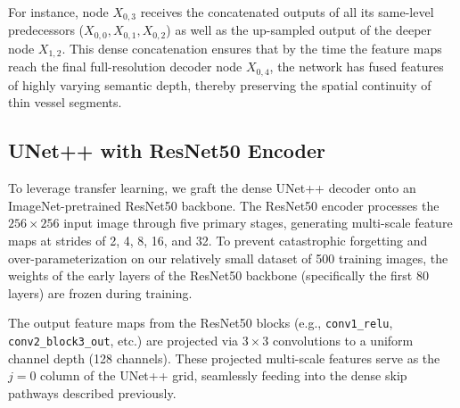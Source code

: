 For instance, node $X_{0,3}$ receives the concatenated outputs of all its same-level predecessors ($X_{0,0}, X_{0,1}, X_{0,2}$) as well as the up-sampled output of the deeper node $X_{1,2}$. This dense concatenation ensures that by the time the feature maps reach the final full-resolution decoder node $X_{0,4}$, the network has fused features of highly varying semantic depth, thereby preserving the spatial continuity of thin vessel segments.

\subsection{UNet++ with ResNet50 Encoder}
To leverage transfer learning, we graft the dense UNet++ decoder onto an ImageNet-pretrained ResNet50 backbone. The ResNet50 encoder processes the $256 \times 256$ input image through five primary stages, generating multi-scale feature maps at strides of 2, 4, 8, 16, and 32. To prevent catastrophic forgetting and over-parameterization on our relatively small dataset of 500 training images, the weights of the early layers of the ResNet50 backbone (specifically the first 80 layers) are frozen during training.

The output feature maps from the ResNet50 blocks (e.g., \texttt{conv1\_relu}, \texttt{conv2\_block3\_out}, etc.) are projected via $3 \times 3$ convolutions to a uniform channel depth (128 channels). These projected multi-scale features serve as the $j=0$ column of the UNet++ grid, seamlessly feeding into the dense skip pathways described previously.

